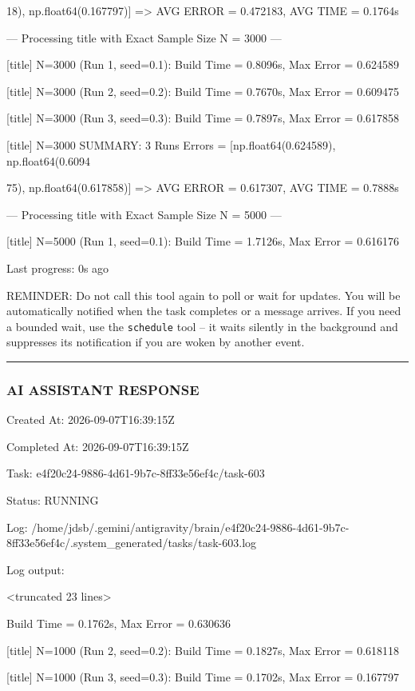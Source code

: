 \documentclass[11pt,a4paper]{article}
\begin{document}
18), np.float64(0.167797)] => AVG ERROR = 0.472183, AVG TIME = 0.1764s

--- Processing title with Exact Sample Size N = 3000 ---

[title] N=3000 (Run 1, seed=0.1): Build Time = 0.8096s, Max Error = 0.624589

[title] N=3000 (Run 2, seed=0.2): Build Time = 0.7670s, Max Error = 0.609475

[title] N=3000 (Run 3, seed=0.3): Build Time = 0.7897s, Max Error = 0.617858

[title] N=3000 SUMMARY: 3 Runs Errors = [np.float64(0.624589), np.float64(0.6094

75), np.float64(0.617858)] => AVG ERROR = 0.617307, AVG TIME = 0.7888s

--- Processing title with Exact Sample Size N = 5000 ---

[title] N=5000 (Run 1, seed=0.1): Build Time = 1.7126s, Max Error = 0.616176


Last progress: 0s ago



REMINDER: Do not call this tool again to poll or wait for updates. You will be automatically notified when the task completes or a message arrives. If you need a bounded wait, use the \texttt{schedule} tool -- it waits silently in the background and suppresses its notification if you are woken by another event.


\hrule

\subsubsection{AI ASSISTANT RESPONSE}

Created At: 2026-09-07T16:39:15Z

Completed At: 2026-09-07T16:39:15Z

Task: e4f20c24-9886-4d61-9b7c-8ff33e56ef4c/task-603

Status: RUNNING

Log: /home/jdsb/.gemini/antigravity/brain/e4f20c24-9886-4d61-9b7c-8ff33e56ef4c/.system\_generated/tasks/task-603.log

Log output:

<truncated 23 lines>

Build Time = 0.1762s, Max Error = 0.630636

[title] N=1000 (Run 2, seed=0.2): Build Time = 0.1827s, Max Error = 0.618118

[title] N=1000 (Run 3, seed=0.3): Build Time = 0.1702s, Max Error = 0.167797
\end{document}
